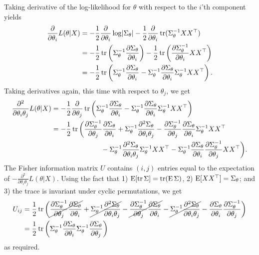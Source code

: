Taking derivative of the log-likelihood for $\theta$ with respect to the $i$'th component yields
\begin{align*}
  \frac{\partial}{\partial \theta_i} L(\theta|X) 
  &= -\half \frac{\partial}{\partial \theta_i} \log \abs{\Sigma_\theta} - \half \frac{\partial}{\partial \theta_i} \tr(\Sigma_\theta^{-1}XX^\top) \\
  &= -\half \tr \left(\Sigma_\theta^{-1} \frac{\partial\Sigma_\theta}{\partial \theta_i}  \right) - \half \tr \left( \frac{\partial\Sigma_\theta^{-1}}{\partial \theta_i} XX^\top \right) \\
  &= -\half \tr \left( \Sigma_\theta^{-1} \frac{\partial\Sigma_\theta}{\partial \theta_i}  -\Sigma_\theta^{-1} \frac{\partial\Sigma_\theta}{\partial \theta_i}\Sigma_\theta^{-1} XX^\top \right).
\end{align*}
Taking derivatives again, this time with respect to $\theta_j$, we get
\begin{align*}
  \frac{\partial^2}{\partial \theta_i\theta_j} L(\theta|X) 
  &= -\half \frac{\partial}{\partial \theta_j} \tr \left( 
  \Sigma_\theta^{-1} \frac{\partial\Sigma_\theta}{\partial \theta_i}  
  - \Sigma_\theta^{-1} \frac{\partial\Sigma_\theta}{\partial \theta_i}\Sigma_\theta^{-1} XX^\top \right) \\
  &= -\half \tr \bigg( 
  \dSjnv \dSi + \Sigma_\theta^{-1} \dStwo
  - \dSjnv \dSi \Sigma_\theta^{-1} XX^\top \\          
  &\hspace{2.5cm} - \Sigma_\theta^{-1}\dStwo\Sigma_\theta^{-1} XX^\top
  - \Sigma_\theta^{-1} \dSi\dSjnv XX^\top
  \bigg).
\end{align*}
The Fisher information matrix $U$ contains $(i,j)$ entries equal to the expectation of $-\frac{\partial^2}{\partial \theta_i\theta_j} L(\theta|X)$. 
Using the fact that 1) $\E [\tr \Sigma] = \tr (\E \Sigma)$, 2) $\E [XX^\top] = \Sigma_\theta$; and 3) the trace is invariant under cyclic permutations, we get
\begin{align*}
  U_{ij} 
  &= \half \tr \left( 
  \cancel{\dSjnv \dSi} + \cancel{\Sigma_\theta^{-1}\dStwo}
  - \cancel{\dSjnv \dSi}  - \cancel{\Sigma_\theta^{-1}\dStwo} -  \dSi\dSjnv \right) \\
  &=  \half \tr \left(\Sigma_\theta^{-1} \dSi \Sigma_\theta^{-1} \dSj \right)
\end{align*}
as required.  
